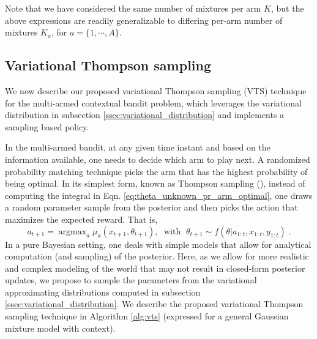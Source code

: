 \documentclass{article}
\newcommand{\argmax}{\mathop{\mathrm{argmax}}}
\begin{document}
Note that we have considered the same number of mixtures per arm $K$, but the above expressions are readily 
generalizable
to differing per-arm number of mixtures $K_a$, for $a=\{1, \cdots, A\}$.

\subsection{Variational Thompson sampling}
\label{ssec:variational_thompson_sampling}

We now describe our proposed variational Thompson sampling (VTS) technique for the multi-armed contextual bandit problem, which leverages the variational distribution in subsection \ref{ssec:variational_distribution} and implements a sampling based policy.

In the multi-armed bandit, at any given time instant and based on the information available, one needs to decide which arm to play next. A randomized probability matching technique picks the arm that has the highest probability of being optimal. In its simplest form, known as Thompson sampling (\cite{j-Thompson1935}), instead of computing the integral in Eqn. \ref{eq:theta_unknown_pr_arm_optimal}, one draws a random parameter sample from the posterior and then picks the action that maximizes the expected reward. That is, 
\begin{equation}
a_{t+1}=\argmax_{a}\mu_{a}(x_{t+1},\theta_{t+1}), \; \text{ with } \; \theta_{t+1} \sim f(\theta|a_{1:t}, x_{1:t}, y_{1:t}) \; .
\end{equation}
In a pure Bayesian setting, one deals with simple models that allow for analytical computation (and sampling) of the posterior. Here, as we allow for more realistic and complex modeling of the world that may not result in closed-form posterior updates, we propose to sample the parameters from the variational approximating distributions computed in subsection \ref{ssec:variational_distribution}. We describe the proposed variational Thompson sampling technique in Algorithm \ref{alg:vts} (expressed for a general Gaussian mixture model with context).
\end{document}
